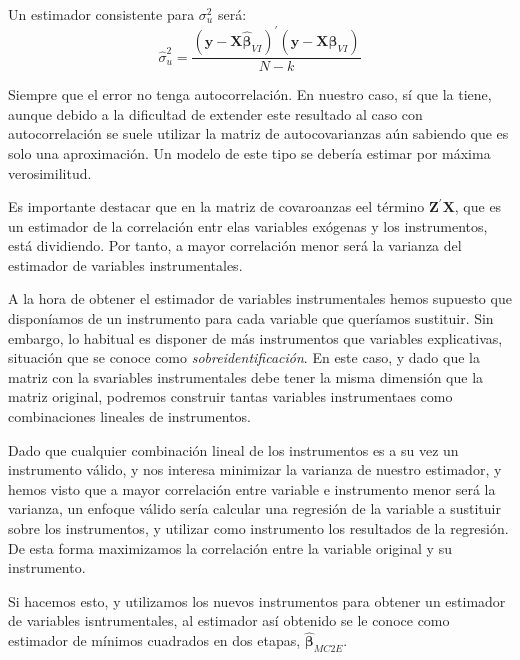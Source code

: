 Un estimador consistente para $\sigma_u^2$ ser\'a:
\[\hat{\sigma}_u^2=\dfrac{\left(\boldsymbol{y}-\boldsymbol{X}\hat{\boldsymbol{\beta}}_{VI}\right)^{\prime}\left(\boldsymbol{y}-\boldsymbol{X}\hat{\boldsymbol{\beta}}_{VI}\right)}{N-k}\]

Siempre que el error no tenga autocorrelaci\'on. En nuestro caso, s\'i que la tiene, aunque debido a la dificultad de extender este resultado al caso con autocorrelaci\'on se suele utilizar la matriz de autocovarianzas a\'un sabiendo que es solo una aproximaci\'on. Un modelo de este tipo se deber\'ia estimar por m\'axima verosimilitud.

Es importante destacar que en la matriz de covaroanzas eel t\'ermino $\boldsymbol{Z}^{\prime}\boldsymbol{X}$, que es un estimador de la correlaci\'on entr elas variables ex\'ogenas y los instrumentos, est\'a dividiendo. Por tanto, a mayor correlaci\'on menor ser\'a la varianza del estimador de variables instrumentales.


A la hora de obtener el estimador de variables instrumentales hemos supuesto que dispon\'iamos de un instrumento para cada variable que quer\'iamos sustituir. Sin embargo, lo habitual es disponer de m\'as instrumentos que variables explicativas, situaci\'on que se conoce como \textit{sobreidentificaci\'on}. En este caso, y dado que la matriz con la svariables instrumentales debe tener la misma dimensi\'on que la matriz original, podremos construir tantas variables instrumentaes como combinaciones lineales de instrumentos.

Dado que cualquier combinaci\'on lineal de los instrumentos es a su vez un instrumento v\'alido, y nos interesa minimizar la varianza de nuestro estimador, y hemos visto que a mayor correlaci\'on entre variable e instrumento menor ser\'a la varianza, un enfoque v\'alido ser\'ia calcular una regresi\'on de la variable a sustituir sobre los instrumentos, y utilizar como instrumento los resultados de la regresi\'on. De esta forma maximizamos la correlaci\'on entre la variable original y su instrumento.

Si hacemos esto, y utilizamos los nuevos instrumentos para obtener un estimador de variables isntrumentales, al estimador as\'i obtenido se le conoce como estimador de m\'inimos cuadrados en dos etapas, $\hat{\boldsymbol{\beta}}_{MC2E}$.


